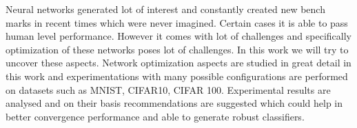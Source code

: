 
Neural networks generated lot of interest and constantly created new bench marks in recent times which were never imagined. Certain cases it is able to pass human level performance. However it comes with lot of challenges and specifically optimization of these networks poses lot of challenges. In this work we will try to uncover these aspects.
Network optimization aspects are studied in great detail in this work and experimentations with many possible configurations are performed on datasets such as MNIST, CIFAR10, CIFAR 100.
Experimental results are analysed and on their basis recommendations are suggested which could help in better convergence performance and able to generate robust classifiers.
